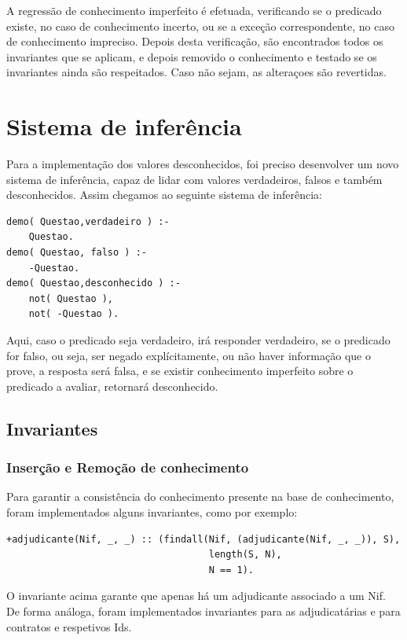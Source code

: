 \documentclass[a4paper]{report}
\begin{document}
A regressão de conhecimento imperfeito é efetuada, verificando se o predicado
existe, no caso de conhecimento incerto, ou se a exceção correspondente, no caso
de conhecimento impreciso. Depois desta verificação, são encontrados todos os
invariantes que se aplicam, e depois removido o conhecimento e testado se os
invariantes ainda são respeitados. Caso não sejam, as alteraçoes são revertidas.

\chapter{Sistema de inferência}

Para a implementação dos valores desconhecidos, foi preciso desenvolver um novo
sistema de inferência, capaz de lidar com valores verdadeiros, falsos e também
desconhecidos. Assim chegamos ao seguinte sistema de inferência: 

\begin{verbatim}
demo( Questao,verdadeiro ) :-
    Questao.
demo( Questao, falso ) :-
    -Questao.
demo( Questao,desconhecido ) :-
    not( Questao ),
    not( -Questao ).
\end{verbatim}

Aqui, caso o predicado seja verdadeiro, irá responder verdadeiro, se o predicado
for falso, ou seja, ser negado explícitamente, ou não haver informação que o
prove, a resposta será falsa, e se existir conhecimento imperfeito sobre o
predicado a avaliar, retornará desconhecido.

\section{Invariantes}

\subsection{Inserção e Remoção de conhecimento}

Para garantir a consistência do conhecimento presente na base de conhecimento,
foram implementados alguns invariantes, como por exemplo:

\begin{verbatim}
+adjudicante(Nif, _, _) :: (findall(Nif, (adjudicante(Nif, _, _)), S),
                                    length(S, N),
                                    N == 1).
\end{verbatim}

O invariante acima garante que apenas há um adjudicante associado a um Nif. De
forma análoga, foram implementados invariantes para as adjudicatárias e para
contratos e respetivos Ids.
\end{document}

